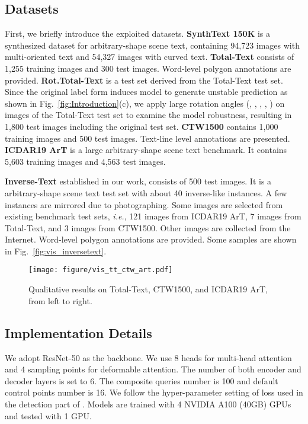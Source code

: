 \documentclass[letterpaper]{article} \usepackage{aaai23}  \usepackage{times}  \usepackage{helvet}  \usepackage{courier}  \usepackage[hyphens]{url}  \usepackage{graphicx} \urlstyle{rm}
\begin{document}
\subsection{Datasets}
First, we briefly introduce the exploited datasets. \textbf{SynthText 150K} \cite{liu2020abcnet} is a synthesized dataset for arbitrary-shape scene text, containing 94,723 images with multi-oriented text and 54,327 images with curved text. \textbf{Total-Text} \cite{ch2020total} consists of 1,255 training images and 300 test images. Word-level polygon annotations are provided. \textbf{Rot.Total-Text} is a test set derived from the Total-Text test set. Since the original label form induces model to generate unstable prediction as shown in Fig.~\ref{fig:Introduction}(c), we apply large rotation angles (, , , , ) on images of the Total-Text test set to examine the model robustness, resulting in 1,800 test images including the original test set. \textbf{CTW1500} \cite{liu2019curved} contains 1,000 training images and 500 test images. Text-line level annotations are presented. \textbf{ICDAR19 ArT} \cite{chng2019icdar2019} is a large arbitrary-shape scene text benchmark. It contains 5,603 training images and 4,563 test images. 

\textbf{Inverse-Text} established in our work, consists of 500 test images. It is a arbitrary-shape scene text test set with about 40 inverse-like instances. A few instances are mirrored due to photographing. Some images are selected from existing benchmark test sets, \emph{i.e.}, 121 images from ICDAR19 ArT, 7 images from Total-Text, and 3 images from CTW1500. Other images are collected from the Internet. Word-level polygon annotations are provided. Some samples are shown in Fig.~\ref{fig:vis_inversetext}. 

\begin{figure}[!t]
    \centering
    \texttt{[image: figure/vis\_tt\_ctw\_art.pdf]}
    \caption{Qualitative results on Total-Text, CTW1500, and ICDAR19 ArT, from left to right.}
    \label{fig:qualitative_tt_ctw_art}
\end{figure}


\subsection{Implementation Details}
\label{subsec:impl details}
We adopt ResNet-50 \cite{he2016deep} as the backbone. We use 8 heads for multi-head attention and 4 sampling points for deformable attention. The number of both encoder and decoder layers is set to 6. The composite queries number  is 100 and default control points number  is 16. We follow the hyper-parameter setting of loss used in the detection part of \cite{zhang2022text}. Models are trained with 4 NVIDIA A100 (40GB) GPUs and tested with 1 GPU.
\end{document}

